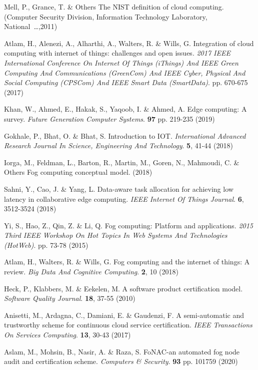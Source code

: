Mell, P., Grance, T. \& Others The NIST definition of cloud computing. (Computer Security Division, Information Technology Laboratory, National …,2011)

Atlam, H., Alenezi, A., Alharthi, A., Walters, R. \& Wills, G. Integration of cloud computing with internet of things: challenges and open issues. {\em 2017 IEEE International Conference On Internet Of Things (iThings) And IEEE Green Computing And Communications (GreenCom) And IEEE Cyber, Physical And Social Computing (CPSCom) And IEEE Smart Data (SmartData)}. pp. 670-675 (2017)

Khan, W., Ahmed, E., Hakak, S., Yaqoob, I. \& Ahmed, A. Edge computing: A survey. {\em Future Generation Computer Systems}. \textbf{97} pp. 219-235 (2019)

Gokhale, P., Bhat, O. \& Bhat, S. Introduction to IOT. {\em International Advanced Research Journal In Science, Engineering And Technology}. \textbf{5}, 41-44 (2018)

Iorga, M., Feldman, L., Barton, R., Martin, M., Goren, N., Mahmoudi, C. \& Others Fog computing conceptual model.  (2018)

Sahni, Y., Cao, J. \& Yang, L. Data-aware task allocation for achieving low latency in collaborative edge computing. {\em IEEE Internet Of Things Journal}. \textbf{6}, 3512-3524 (2018)

Yi, S., Hao, Z., Qin, Z. \& Li, Q. Fog computing: Platform and applications. {\em 2015 Third IEEE Workshop On Hot Topics In Web Systems And Technologies (HotWeb)}. pp. 73-78 (2015)

Atlam, H., Walters, R. \& Wills, G. Fog computing and the internet of things: A review. {\em Big Data And Cognitive Computing}. \textbf{2}, 10 (2018)

Heck, P., Klabbers, M. \& Eekelen, M. A software product certification model. {\em Software Quality Journal}. \textbf{18}, 37-55 (2010)

Anisetti, M., Ardagna, C., Damiani, E. \& Gaudenzi, F. A semi-automatic and trustworthy scheme for continuous cloud service certification. {\em IEEE Transactions On Services Computing}. \textbf{13}, 30-43 (2017)

Aslam, M., Mohsin, B., Nasir, A. \& Raza, S. FoNAC-an automated fog node audit and certification scheme. {\em Computers \& Security}. \textbf{93} pp. 101759 (2020)


